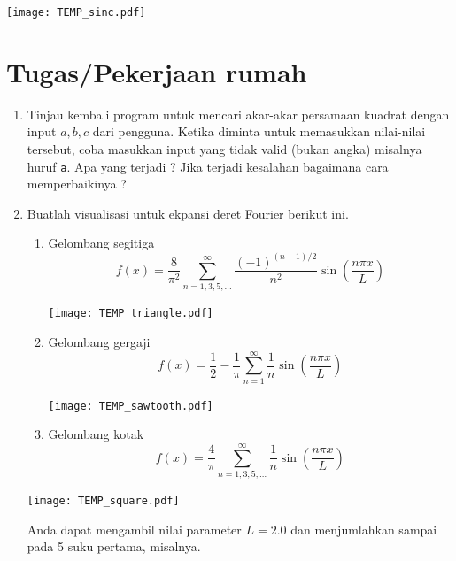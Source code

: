 \documentclass[a4paper,11pt]{extarticle}
\begin{document}
{\centering
\texttt{[image: TEMP\_sinc.pdf]}
\par}

\section{Tugas/Pekerjaan rumah}

\begin{enumerate}
\item Tinjau kembali program untuk mencari akar-akar persamaan kuadrat dengan input
$a, b, c$ dari pengguna. Ketika diminta untuk memasukkan nilai-nilai tersebut,
coba masukkan input yang tidak valid (bukan angka) misalnya huruf \texttt{a}.
Apa yang terjadi ?
Jika terjadi kesalahan bagaimana cara memperbaikinya ?
%
\item Buatlah visualisasi untuk ekpansi deret Fourier berikut ini.
  \begin{enumerate}
  \item Gelombang segitiga
  \begin{equation}
  f(x) = \frac{8}{\pi^2} \sum_{n=1,3,5,\ldots}^{\infty}
  \frac{(-1)^{(n-1)/2}}{n^2}\sin\left( \frac{n\pi x}{L} \right)
  \end{equation}
  {\centering
  \texttt{[image: TEMP\_triangle.pdf]}
  \par}
  \item Gelombang gergaji
  \begin{equation}
  f(x) = \frac{1}{2} - \frac{1}{\pi}\sum_{n=1}^{\infty}
  \frac{1}{n}\sin\left( \frac{n\pi x}{L} \right)
  \end{equation}
  {\centering
  \texttt{[image: TEMP\_sawtooth.pdf]}
  \par}
  \item Gelombang kotak
  \begin{equation}
  f(x) = \frac{4}{\pi}\sum_{n=1,3,5,\ldots}^{\infty}
  \frac{1}{n} \sin\left( \frac{n\pi x}{L} \right)
  \end{equation}
  \end{enumerate}
  {\centering
  \texttt{[image: TEMP\_square.pdf]}
  \par}
  Anda dapat mengambil nilai parameter $L = 2.0$ dan
  menjumlahkan sampai pada 5 suku pertama, misalnya.
%
\end{enumerate}
\end{document}
